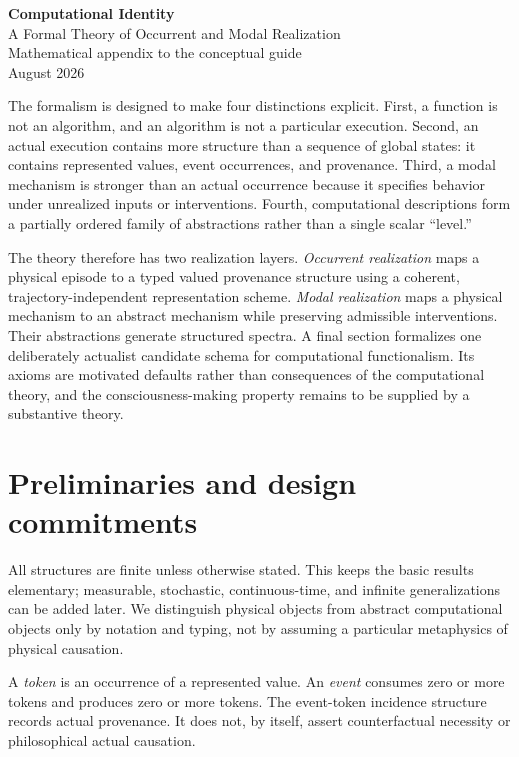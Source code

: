 \documentclass[11pt,a4paper]{article}
\theoremstyle{clean}
\theoremstyle{definition}
\begin{document}
\begin{center}
{\LARGE\bfseries\color{navy} Computational Identity}\\[2mm]
{\Large A Formal Theory of Occurrent and Modal Realization}\\[3mm]
{\large Mathematical appendix to the conceptual guide}\\[3mm]
{\small August 2026}
\end{center}

\begin{summarybox}[title={Purpose}]
The formalism is designed to make four distinctions explicit. First, a function is not an algorithm, and an algorithm is not a particular execution. Second, an actual execution contains more structure than a sequence of global states: it contains represented values, event occurrences, and provenance. Third, a modal mechanism is stronger than an actual occurrence because it specifies behavior under unrealized inputs or interventions. Fourth, computational descriptions form a partially ordered family of abstractions rather than a single scalar ``level.''

The theory therefore has two realization layers. \emph{Occurrent realization} maps a physical episode to a typed valued provenance structure using a coherent, trajectory-independent representation scheme. \emph{Modal realization} maps a physical mechanism to an abstract mechanism while preserving admissible interventions. Their abstractions generate structured spectra. A final section formalizes one deliberately actualist candidate schema for computational functionalism. Its axioms are motivated defaults rather than consequences of the computational theory, and the consciousness-making property remains to be supplied by a substantive theory.
\end{summarybox}

\section{Preliminaries and design commitments}

All structures are finite unless otherwise stated. This keeps the basic results elementary; measurable, stochastic, continuous-time, and infinite generalizations can be added later. We distinguish physical objects from abstract computational objects only by notation and typing, not by assuming a particular metaphysics of physical causation.

A \emph{token} is an occurrence of a represented value. An \emph{event} consumes zero or more tokens and produces zero or more tokens. The event-token incidence structure records actual provenance. It does not, by itself, assert counterfactual necessity or philosophical actual causation.
\end{document}
